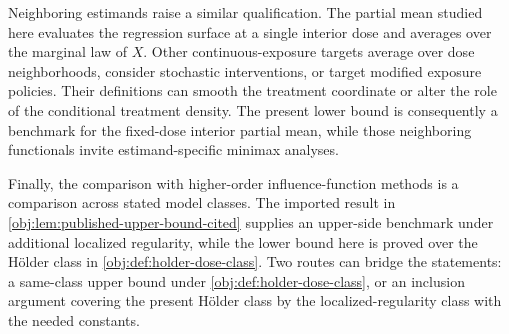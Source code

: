 Neighboring estimands raise a similar qualification. The partial mean studied here evaluates the regression surface at a single interior dose and averages over the marginal law of \(X\). Other continuous-exposure targets average over dose neighborhoods, consider stochastic interventions, or target modified exposure policies. Their definitions can smooth the treatment coordinate or alter the role of the conditional treatment density. The present lower bound is consequently a benchmark for the fixed-dose interior partial mean, while those neighboring functionals invite estimand-specific minimax analyses.

Finally, the comparison with higher-order influence-function methods is a comparison across stated model classes. The imported result in \cref{obj:lem:published-upper-bound-cited} supplies an upper-side benchmark under additional localized regularity, while the lower bound here is proved over the Hölder class in \cref{obj:def:holder-dose-class}. Two routes can bridge the statements: a same-class upper bound under \cref{obj:def:holder-dose-class}, or an inclusion argument covering the present Hölder class by the localized-regularity class with the needed constants.
